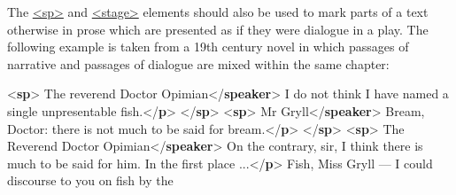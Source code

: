 The \hyperref[TEI.sp]{<sp>} and \hyperref[TEI.stage]{<stage>} elements should also be used to mark parts of a text otherwise in prose which are presented as if they were dialogue in a play. The following example is taken from a 19th century novel in which passages of narrative and passages of dialogue are mixed within the same chapter: \par\bgroup{}\exampleFont \begin{shaded}\noindent\mbox{}{<\textbf{sp}>}\mbox{}\newline 
{}The reverend Doctor Opimian{</\textbf{speaker}>}\mbox{}\newline 
{}I do not think I have named a single unpresentable fish.{</\textbf{p}>}\mbox{}\newline 
{</\textbf{sp}>}\mbox{}\newline 
{<\textbf{sp}>}\mbox{}\newline 
{}Mr Gryll{</\textbf{speaker}>}\mbox{}\newline 
{}Bream, Doctor: there is not much to be said for bream.{</\textbf{p}>}\mbox{}\newline 
{</\textbf{sp}>}\mbox{}\newline 
{<\textbf{sp}>}\mbox{}\newline 
{}The Reverend Doctor Opimian{</\textbf{speaker}>}\mbox{}\newline 
{}On the contrary, sir, I think there is much to be said for him.\mbox{}\newline 
\hspace*{1em}\hspace*{1em} In the first place ...{</\textbf{p}>}\mbox{}\newline 
{}Fish, Miss Gryll — I could discourse to you on fish by the\mbox{}\newline 

\end{shaded}
